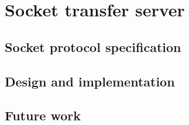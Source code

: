 %
\section{Socket transfer server}

\subsection{Socket protocol specification}

\subsection{Design and implementation}

\subsection{Future work}
